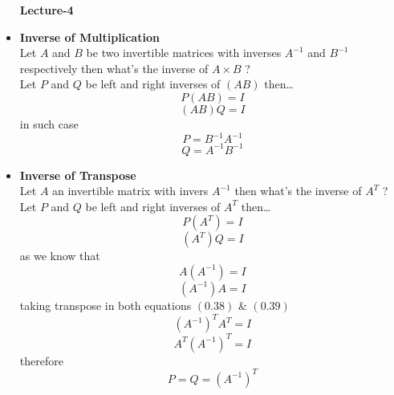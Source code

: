 \documentclass[a4paper,11pt]{article}
\numberwithin{equation}{section}
\begin{document}
\begin{itemize}
\begin{center}
    \Huge{\textbf{Lecture-4}}
\end{center}
\vspace{5pt}

    \item \textbf{Inverse of Multiplication}\\
        Let $A$ and $B$ be two invertible matrices with inverses $A^{-1}$ and $B^{-1}$ respectively then what's the inverse of $A \times B$ ?\\
Let $P$ and $Q$ be left and right inverses of $(AB)$ then\dots
        \begin{equation}
            P  (A  B)=I
        \end{equation}
        \begin{equation}
            (A  B)  Q=I
        \end{equation}
in such case
        \begin{equation}
            P=B^{-1}A^{-1}
        \end{equation}
        \begin{equation}
            Q=A^{-1}B^{-1}
        \end{equation}
        \item \textbf{Inverse of Transpose}\\
        Let $A$ an invertible matrix with invers $A^{-1}$ then what's the inverse of $A^T$ ?\\
Let $P$ and $Q$ be left and right inverses of $A^T$ then\dots
        \begin{equation}
            P  (A^T)=I
        \end{equation}
        \begin{equation}
            (A^T)  Q=I
        \end{equation}
as we know that
        \begin{equation}
            A(A^{-1})=I
        \end{equation}
        \begin{equation}
            (A^{-1})A=I
        \end{equation}
taking transpose in both equations $(0.38)$ \& $(0.39)$
        \begin{equation}
            (A^{-1})^{T}A^{T}=I
        \end{equation}
        \begin{equation}
            A^{T}(A^{-1})^{T}=I
        \end{equation}
therefore 
        \begin{equation}
            P=Q=(A^{-1})^{T}
        \end{equation}


\end{itemize}
\end{document}
